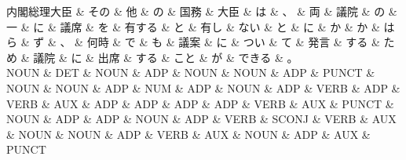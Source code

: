 \documentclass[tikz,border=5pt]{standalone}
\begin{document}
\small
\begin{dependency}[edge unit distance=12.0pt]
    \begin{deptext}[column sep=0.5em]
        内閣総理大臣 \& その \& 他 \& の \& 国務 \& 大臣 \& は \& 、 \& 両 \& 議院 \& の \& 一 \& に \& 議席 \& を \& 有する \& と \& 有し \& ない \& と \& に \& か \& か \& はら \& ず \& 、 \& 何時 \& で \& も \& 議案 \& に \& つい \& て \& 発言 \& する \& ため \& 議院 \& に \& 出席 \& する \& こと \& が \& できる \& 。\\
        NOUN \& DET \& NOUN \& ADP \& NOUN \& NOUN \& ADP \& PUNCT \& NOUN \& NOUN \& ADP \& NUM \& ADP \& NOUN \& ADP \& VERB \& ADP \& VERB \& AUX \& ADP \& ADP \& ADP \& ADP \& VERB \& AUX \& PUNCT \& NOUN \& ADP \& ADP \& NOUN \& ADP \& VERB \& SCONJ \& VERB \& AUX \& NOUN \& NOUN \& ADP \& VERB \& AUX \& NOUN \& ADP \& AUX \& PUNCT\\
    \end{deptext}
\end{dependency}
\end{document}
